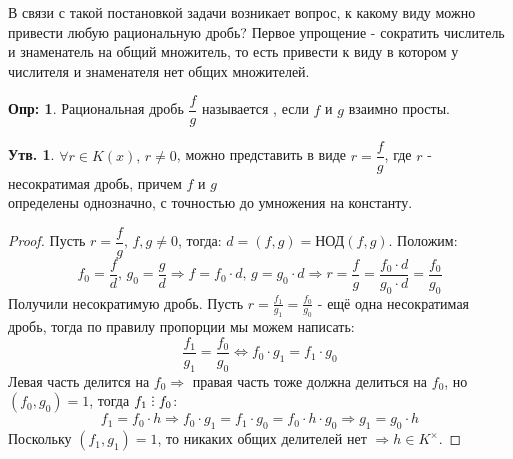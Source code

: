 \documentclass[12pt]{article}
\theoremstyle{definition}
\newtheorem{defn}{Опр:}
\newtheorem{prop}{Утв.}
\DeclareRobustCommand{\divby}{%
	\mathrel{\text{\vbox{\baselineskip.65ex\lineskiplimit0pt\hbox{.}\hbox{.}\hbox{.}}}}%
}
\begin{document}
В связи с такой постановкой задачи возникает вопрос, к какому виду можно привести любую рациональную дробь? Первое упрощение - сократить числитель и знаменатель на общий множитель, то есть привести к виду в котором у числителя и знаменателя нет общих множителей.

\begin{defn}
	Рациональная дробь $\dfrac{f}{g}$ называется , если $f$ и $g$ взаимно просты.
\end{defn}

\begin{prop}
	$\forall r \in K(x), \, r \neq 0$, можно представить в виде $r = \dfrac{f}{g}$, где $r$ - несократимая дробь, причем $f$ и $g$ \\[4pt]определены однозначно, с точностью до умножения на константу.
\end{prop}
\begin{proof}
	Пусть $r = \dfrac{f}{g}, \, f,g \neq 0$, тогда: $d = (f,g) = \text{НОД}(f,g)$. Положим:
	$$
		f_0 = \dfrac{f}{d}, \, g_0 = \dfrac{g}{d} \Rightarrow f = f_0{\cdot}d,\, g = g_0{\cdot}d \Rightarrow r = \dfrac{f}{g} = \dfrac{f_0{\cdot}d}{g_0{\cdot}d} = \dfrac{f_0}{g_0}	
	$$
	Получили несократимую дробь. Пусть $r = \tfrac{f_1}{g_1} = \tfrac{f_0}{g_0}$ - ещё одна несократимая дробь, тогда по правилу пропорции мы можем написать:
	$$
		\dfrac{f_1}{g_1} = \dfrac{f_0}{g_0} \Leftrightarrow f_0{\cdot}g_1 = f_1{\cdot}g_0
	$$
	Левая часть делится на $f_0 \Rightarrow$ правая часть тоже должна делиться на $f_0$, но $(f_0,g_0) = 1$, тогда $f_1 \divby f_0$:
	$$
		f_1 = f_0{\cdot}h \Rightarrow f_0{\cdot}g_1 = f_1{\cdot}g_0 = f_0{\cdot}h{\cdot}g_0 \Rightarrow g_1 = g_0{\cdot}h
	$$
	Поскольку $(f_1,g_1) = 1$, то никаких общих делителей нет $\Rightarrow h \in K^{\times}$.
\end{proof}
\end{document}
